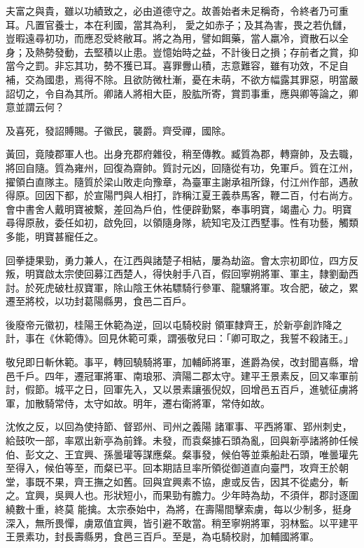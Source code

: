\begin{pinyinscope}
 夫富之與貴，雖以功績致之，必由道德守之。故善始者未足稱奇，令終者乃可重耳。凡置官養士，本在利國，當其為利，
 愛之如赤子；及其為害，畏之若仇讎，豈暇遠尋初功，而應忍受終敝耳。將之為用，譬如餌藥，當人羸冷，資散石以全身；及熱勢發動，去堅積以止患。豈憶始時之益，不計後日之損；存前者之賞，抑當今之罰。非忘其功，勢不獲已耳。喜罪釁山積，志意難容，雖有功效，不足自補，交為國患，焉得不除。且欲防微杜漸，憂在未萌，不欲方幅露其罪惡，明當嚴詔切之，令自為其所。卿諸人將相大臣，股肱所寄，賞罰事重，應與卿等論之，卿意並謂云何？



 及喜死，發詔賻賜。子徽民，襲爵。齊受禪，國除。



 黃回，竟陵郡軍人也。出身充郡府雜役，稍至傳教。臧質為郡，轉齋帥，及去職，將回自隨。質為雍州，回復為齋帥。質討元凶，回隨從有功，免軍戶。質在江州，擢領白直隊主。隨質於梁山敗走向豫章，為臺軍主謝承祖所錄，付江州作部，遇赦得原。回因下都，於宣陽門與人相打，詐稱江夏王義恭馬客，鞭二百，付右尚方。會中書舍人戴明寶被繫，差回為戶伯，性便辟勤緊，奉事明寶，竭盡心
 力。明寶尋得原赦，委任如初，啟免回，以領隨身隊，統知宅及江西墅事。性有功藝，觸類多能，明寶甚寵任之。



 回拳捷果勁，勇力兼人，在江西與諸楚子相結，屢為劫盜。會太宗初即位，四方反叛，明寶啟太宗使回募江西楚人，得快射手八百，假回寧朔將軍、軍主，隸劉勔西討。於死虎破杜叔寶軍，除山陰王休祐驃騎行參軍、龍驤將軍。攻合肥，破之，累遷至將校，以功封葛陽縣男，食邑二百戶。



 後廢帝元徽初，桂陽王休範為逆，回以屯騎校尉
 領軍隸齊王，於新亭創詐降之計，事在《休範傳》。回見休範可乘，謂張敬兒曰：「卿可取之，我誓不殺諸王。」



 敬兒即日斬休範。事平，轉回驍騎將軍，加輔師將軍，進爵為侯，改封聞喜縣，增邑千戶。四年，遷冠軍將軍、南琅邪、濟陽二郡太守。建平王景素反，回又率軍前討，假節。城平之日，回軍先入，又以景素讓張倪奴，回增邑五百戶，進號征虜將軍，加散騎常侍，太守如故。明年，遷右衛將軍，常侍如故。



 沈攸之反，以回為使持節、督郢州、司州之義陽
 諸軍事、平西將軍、郢州刺史，給鼓吹一部，率眾出新亭為前鋒。未發，而袁粲據石頭為亂，回與新亭諸將帥任候伯、彭文之、王宜興、孫曇瓘等謀應粲。粲事發，候伯等並乘船赴石頭，唯曇瓘先至得入，候伯等至，而粲已平。回本期詰旦率所領從御道直向臺門，攻齊王於朝堂，事既不果，齊王撫之如舊。回與宜興素不協，慮或反告，因其不從處分，斬之。宜興，吳興人也。形狀短小，而果勁有膽力。少年時為劫，不須伴，郡討逐圍繞數十重，終莫
 能擒。太宗泰始中，為將，在壽陽間擊索虜，每以少制多，挺身深入，無所畏憚，虜眾值宜興，皆引避不敢當。稍至寧朔將軍，羽林監。以平建平王景素功，封長壽縣男，食邑三百戶。至是，為屯騎校尉，加輔國將軍。




\end{pinyinscope}
